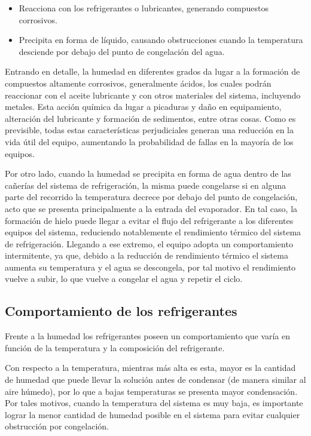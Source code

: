 	\begin{itemize}
		\item Reacciona con los refrigerantes o lubricantes, generando compuestos corrosivos.
		\item Precipita en forma de líquido, causando obstrucciones cuando la temperatura desciende por debajo del punto de congelación del agua.
	\end{itemize}

	Entrando en detalle, la humedad en diferentes grados da lugar a la formación de compuestos altamente corrosivos, generalmente ácidos, los cuales podrán reaccionar con el aceite lubricante y con otros materiales del sistema, incluyendo metales. Esta acción química da lugar a picaduras y daño en equipamiento, alteración del lubricante y formación de sedimentos, entre otras cosas. Como es previsible, todas estas características perjudiciales generan una reducción en la vida útil del equipo, aumentando la probabilidad de fallas en la mayoría de los equipos.

	Por otro lado, cuando la humedad se precipita en forma de agua dentro de las cañerías del sistema de refrigeración, la misma puede congelarse si en alguna parte del recorrido la temperatura decrece por debajo del punto de congelación, acto que se presenta principalmente a la entrada del evaporador. En tal caso, la formación de hielo puede llegar a evitar el flujo del refrigerante a los diferentes equipos del sistema, reduciendo notablemente el rendimiento térmico del sistema de refrigeración. Llegando a ese extremo, el equipo adopta un comportamiento intermitente, ya que, debido a la reducción de rendimiento térmico el sistema aumenta su temperatura y el agua se descongela, por tal motivo el rendimiento vuelve a subir, lo que vuelve a congelar el agua y repetir el ciclo. 

	\subsection{Comportamiento de los refrigerantes}

	Frente a la humedad los refrigerantes poseen un comportamiento que varía en función de la temperatura y la composición del refrigerante. 
	
	Con respecto a la temperatura, mientras más alta es esta, mayor es la cantidad de humedad que puede llevar la solución antes de condensar (de manera similar al aire húmedo), por lo que a bajas temperaturas se presenta mayor condensación. Por tales motivos, cuando la temperatura del sistema es muy baja, es importante lograr la menor cantidad de humedad posible en el sistema para evitar cualquier obstrucción por congelación. 
	
